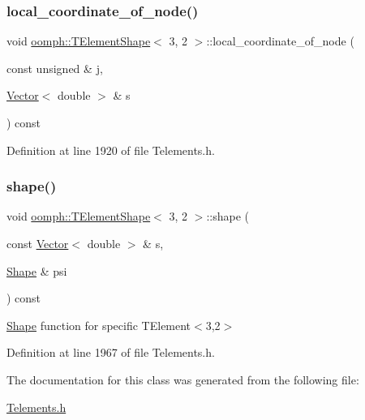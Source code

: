 \subsubsection{\texorpdfstring{local\+\_\+coordinate\+\_\+of\+\_\+node()}{local\_coordinate\_of\_node()}}
{\footnotesize\ttfamily void \hyperlink{classoomph_1_1TElementShape}{oomph\+::\+T\+Element\+Shape}$<$ 3, 2 $>$\+::local\+\_\+coordinate\+\_\+of\+\_\+node (\begin{DoxyParamCaption}\item[{const unsigned \&}]{j,  }\item[{\hyperlink{classoomph_1_1Vector}{Vector}$<$ double $>$ \&}]{s }\end{DoxyParamCaption}) const\hspace{0.3cm}{\ttfamily [inline]}}



Definition at line 1920 of file Telements.\+h.

\mbox{\label{classoomph_1_1TElementShape_3_013_00_012_01_4_af7ddd0378cfdad4cfd24d7089ee859b6}} 
\subsubsection{\texorpdfstring{shape()}{shape()}}
{\footnotesize\ttfamily void \hyperlink{classoomph_1_1TElementShape}{oomph\+::\+T\+Element\+Shape}$<$ 3, 2 $>$\+::shape (\begin{DoxyParamCaption}\item[{const \hyperlink{classoomph_1_1Vector}{Vector}$<$ double $>$ \&}]{s,  }\item[{\hyperlink{classoomph_1_1Shape}{Shape} \&}]{psi }\end{DoxyParamCaption}) const\hspace{0.3cm}{\ttfamily [inline]}}



\hyperlink{classoomph_1_1Shape}{Shape} function for specific T\+Element$<$3,2$>$ 



Definition at line 1967 of file Telements.\+h.



The documentation for this class was generated from the following file\+:\begin{DoxyCompactItemize}
\item 
\hyperlink{Telements_8h}{Telements.\+h}\end{DoxyCompactItemize}
